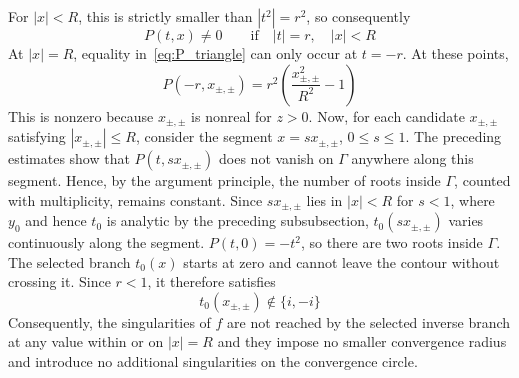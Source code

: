 \documentclass[a4paper]{amsart}
\begin{document}
For $|x|<R$, this is strictly smaller than $|t^2|=r^2$,
so consequently
\begin{equation*}
P(t,x)\neq0\qquad\text{if}\quad|t|=r,\quad |x|<R
\end{equation*}
At $|x|=R$, equality in~\eqref{eq:P_triangle} can only occur at $t=-r$. At these points,
\begin{equation*}
P(-r,x_{\pm,\pm})
=r^2\left(\frac{x_{\pm,\pm}^2}{R^2}-1\right)
\end{equation*}
This is nonzero because $x_{\pm,\pm}$ is nonreal for $z>0$.
%
Now, for each candidate $x_{\pm,\pm}$ satisfying $|x_{\pm,\pm}|\leq R$, consider the segment $x=sx_{\pm,\pm}$, $0\leq s\leq1$. The preceding estimates show that $P(t,sx_{\pm,\pm})$ does not vanish on $\Gamma$ anywhere along this segment. Hence, by the argument principle, the number of roots inside $\Gamma$, counted with multiplicity, remains constant.
%
Since $sx_{\pm,\pm}$ lies in $|x|<R$ for $s<1$, where $y_0$ and hence $t_0$ is analytic by the preceding subsubsection, $t_0(sx_{\pm,\pm})$ varies continuously along the segment.
%
$P(t,0)=-t^2$, so there are two roots inside $\Gamma$. The selected branch $t_0(x)$ starts at zero and cannot leave the contour without crossing it. Since $r<1$, it therefore satisfies
\begin{equation*}
t_0(x_{\pm,\pm})\notin\{i,-i\}
\end{equation*}
Consequently, the singularities of $f$ are not reached by the selected inverse branch at any value within or on $|x|=R$ and they impose no smaller convergence radius and introduce no additional singularities on the convergence circle.
\end{document}
